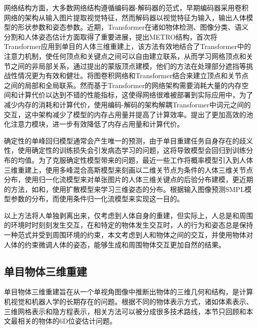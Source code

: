 网络结构方面，大多数网络结构遵循编码器-解码器的范式，早期编码器采用卷积网络的架构从输入图片提取视觉特征，然而解码器以视觉特征为输入，输出人体模型的形状参数和姿态参数。近期，Transformer在诸如物体检测、图像分类、语义分割和人体姿态估计方面取得了重要进展，\citet{Lin_2021_CVPR}提出METRO结构，首次将Transformer应用到单目的人体三维重建上，该方法有效地结合了Transformer中的注意力机制，使任何顶点和关键点之间可以自由建立联系，从而学习网格顶点和关节之间的非局部关系，通过提出的蒙版顶点建模，他们的方法在处理部分遮挡等挑战性情况更为有效和健壮。\citet{Lin_2021_ICCV}将图卷积网络和Transformer结合来建立顶点和关节点之间的局部和全局联系。然而基于Transformer的网络架构需要消耗大量的内存空间和计算代价以达到不错的性能指标，这使得网络很难被部署到实际应用中，为了减少内存的消耗和计算代价，\citet{cho2022FastMETRO}使用编码-解码的架构解耦Transformer中词元之间的交互，这中架构减少了模型的内存占用量并提高了计算效率。\citet{Zheng_2023_CVPR}提出了更加高效的池化注意力模块，进一步有效降低了内存占用量和计算代价。

确定性的单峰回归模型通常会产生唯一的预测，由于单目重建任务自身存在的歧义性，使用确定性的训练损失会引发病态学习的问题，这将导致模型会回归到训练分布的均值\citep{Sengupta2024DiffHumanPP}。为了克服确定性模型带来的问题，最近一些工作将概率模型引入到人体三维重建上，\citet{Li_2019_CVPR}使用多峰混合高斯模型来刻画以二维关节点为条件的人体三维关节点分布，\citet{Wehrbein_2021_ICCV}使用归一化流模型来对单张图片的人体三维关键点的后验分布建模，更近期的方法，如\citet{Gong_2023_CVPR}和\citet{Shan_2023_ICCV}，使用扩散模型来学习三维姿态的分布。\citet{NEURIPS2020_ebf99bb5}根据输入图像预测SMPL模型参数的分布，而\citet{Kolotouros2021ProbabilisticMF}使用条件归一化流模型来实现这一目的。

以上方法将人单独剥离出来，仅考虑到人体自身的重建，但实际上，人总是和周围的环境时时刻刻发生交互，在和特定的物体发生交互时，人的行为和姿态总是保持一种范式并受到周围环境的约束，本文考虑到人和物体之间的交互，并使用物体对人体的约束微调人体的姿态，能够生成和周围物体交互更加自然的结果。

\subsection{单目物体三维重建}

单目物体三维重建旨在从一个单视角图像中推断出物体的三维几何和结构，是计算机视觉和机器人学的长期存在的问题。根据不同的物体表示方式，诸如体素表示、三维网格表示和隐方程表示，相关方法可以被分成很多技术路线，本节只回顾和本文最相关的物体的6D位姿估计问题。

